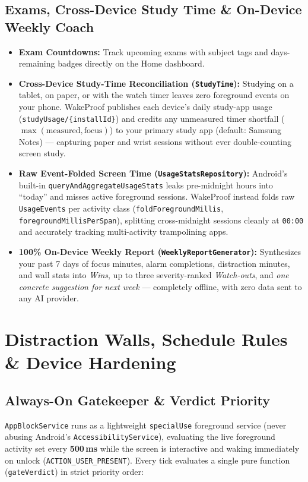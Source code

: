\documentclass[11pt,a4paper]{article}
\begin{document}
\subsection{Exams, Cross-Device Study Time \& On-Device Weekly Coach}
\begin{itemize}
  \item \textbf{Exam Countdowns:} Track upcoming exams with subject tags and days-remaining badges directly on the Home dashboard.
  \item \textbf{Cross-Device Study-Time Reconciliation (\texttt{StudyTime}):} Studying on a tablet, on paper, or with the watch timer leaves zero foreground events on your phone. WakeProof publishes each device's daily study-app usage (\texttt{studyUsage/\{installId\}}) and credits any unmeasured timer shortfall ($\max(\text{measured}, \text{focus})$) to your primary study app (default: Samsung Notes) --- capturing paper and wrist sessions without ever double-counting screen study.
  \item \textbf{Raw Event-Folded Screen Time (\texttt{UsageStats\allowbreak Repository}):} Android's built-in \texttt{queryAnd\allowbreak Aggregate\allowbreak UsageStats} leaks pre-midnight hours into ``today'' and misses active foreground sessions. WakeProof instead folds raw \texttt{UsageEvents} per activity class (\texttt{foldForeground\allowbreak Millis}, \texttt{foregroundMillis\allowbreak PerSpan}), splitting cross-midnight sessions cleanly at \texttt{00:00} and accurately tracking multi-activity trampolining apps.
  \item \textbf{100\% On-Device Weekly Report (\texttt{WeeklyReportGenerator}):} Synthesizes your past 7 days of focus minutes, alarm completions, distraction minutes, and wall stats into \emph{Wins}, up to three severity-ranked \emph{Watch-outs}, and \emph{one concrete suggestion for next week} --- completely offline, with zero data sent to any AI provider.
\end{itemize}

\section{Distraction Walls, Schedule Rules \& Device Hardening}

\subsection{Always-On Gatekeeper \& Verdict Priority}
\texttt{AppBlockService} runs as a lightweight \texttt{specialUse} foreground service (never abusing Android's \texttt{AccessibilityService}), evaluating the live foreground activity set every \textbf{500\,ms} while the screen is interactive and waking immediately on unlock (\texttt{ACTION\_USER\_PRESENT}). Every tick evaluates a single pure function (\texttt{gateVerdict}) in strict priority order:
\end{document}
